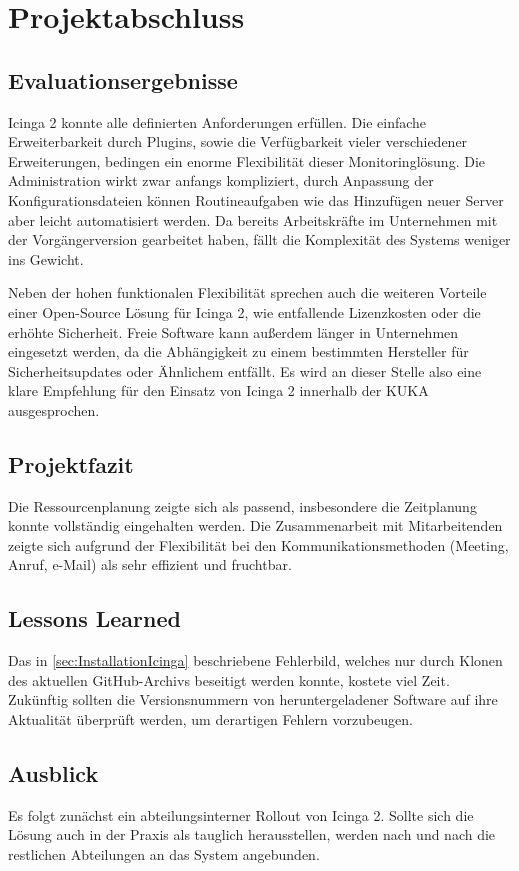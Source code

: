 \section{Projektabschluss} 
\label{sec:projektabschluss}

\subsection{Evaluationsergebnisse}
\label{sec:Evaluationsergebnisse}
\glqq{}Icinga 2\grqq{} konnte alle definierten Anforderungen erfüllen. Die einfache Erweiterbarkeit durch Plugins, sowie die Verfügbarkeit vieler verschiedener Erweiterungen, bedingen ein enorme Flexibilität dieser Monitoringlösung. Die Administration wirkt zwar anfangs kompliziert, durch Anpassung der Konfigurationsdateien können Routineaufgaben wie das Hinzufügen neuer Server aber leicht automatisiert werden. Da bereits Arbeitskräfte im Unternehmen mit der Vorgängerversion gearbeitet haben, fällt die Komplexität des Systems weniger ins Gewicht.

Neben der hohen funktionalen Flexibilität sprechen auch die weiteren Vorteile einer Open-Source Lösung für \glqq{}Icinga 2\grqq{}, wie entfallende Lizenzkosten oder die erhöhte Sicherheit. Freie Software kann außerdem länger in Unternehmen eingesetzt werden, da die Abhängigkeit zu einem bestimmten Hersteller für Sicherheitsupdates oder Ähnlichem entfällt. Es wird an dieser Stelle also eine klare Empfehlung für den Einsatz von \grqq{}Icinga 2\grqq{} innerhalb der KUKA ausgesprochen.

\subsection{Projektfazit}
\label{sec:Projektfazit}
Die Ressourcenplanung zeigte sich als passend, insbesondere die Zeitplanung konnte vollständig eingehalten werden. Die Zusammenarbeit mit Mitarbeitenden zeigte sich aufgrund der Flexibilität bei den Kommunikationsmethoden (Meeting, Anruf, e-Mail) als sehr effizient und fruchtbar.

\subsection{Lessons Learned}
\label{sec:LessonsLearned}
Das in \ref{sec:InstallationIcinga}  beschriebene Fehlerbild, welches nur durch Klonen des aktuellen GitHub-Archivs beseitigt werden konnte, kostete viel Zeit. Zukünftig sollten die Versionsnummern von heruntergeladener Software auf ihre Aktualität überprüft werden, um derartigen Fehlern vorzubeugen.

\subsection{Ausblick}
\label{sec:Ausblick}
Es folgt zunächst ein abteilungsinterner Rollout von \glqq{}Icinga 2\grqq{}. Sollte sich die Lösung auch in der Praxis als tauglich herausstellen, werden nach und nach die restlichen Abteilungen an das System angebunden.